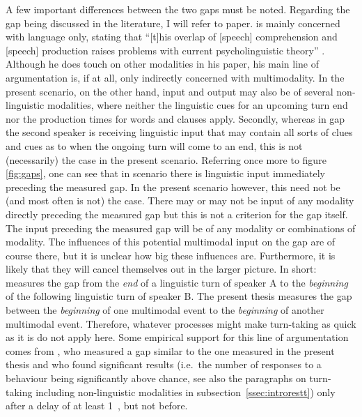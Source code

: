A few important differences between the two gaps must be noted.
Regarding the gap being discussed in the literature, I will refer to  paper.
\citeauthor{levinson_turn-taking_2016} is mainly concerned with language only, stating that ``[t]his overlap of [speech] comprehension and [speech] production raises problems with current psycholinguistic theory'' \citeyearpar[]{levinson_turn-taking_2016}.
Although he does touch on other modalities in his paper, his main line of argumentation is, if at all, only indirectly concerned with multimodality.
In the present scenario, on the other hand, input and output may also be of several non-linguistic modalities, where neither the linguistic cues for an upcoming turn end nor the production times for words and clauses apply.
Secondly, whereas in  gap the second speaker is receiving linguistic input that may contain all sorts of clues and cues as to when the ongoing turn will come to an end, this is not (necessarily) the case in the present scenario.
Referring once more to figure \ref{fig:gaps}, one can see that in  scenario there is linguistic input immediately preceding the measured gap.
In the present scenario however, this need not be (and most often is not) the case.
There may or may not be input of any modality directly preceding the measured gap but this is not a criterion for the gap itself.
The input preceding the measured gap will be of any modality or combinations of modality.
The influences of this potential multimodal input on the gap are of course there, but it is unclear how big these influences are.
Furthermore, it is likely that they will cancel themselves out in the larger picture.
In short:
\citeauthor{levinson_turn-taking_2016} measures the gap from the \emph{end} of a linguistic turn of speaker A to the \emph{beginning} of the following linguistic turn of speaker B.
The present thesis measures the gap between the \emph{beginning} of one multimodal event to the \emph{beginning} of another multimodal event.
Therefore, whatever processes might make turn-taking as quick as it is do not apply here.
Some empirical support for this line of argumentation comes from \citet{vanegeren_mother-infant_2001}, who measured a gap similar to the one measured in the present thesis and who found significant results (i.e.~the number of responses to a behaviour being significantly above chance, see also the paragraphs on turn-taking including non-linguistic modalities in subsection~\ref{ssec:introrestt}) only after a delay of at least 1~\sone, but not before.

